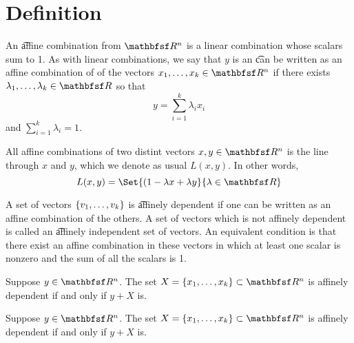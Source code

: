 
\section*{Definition}

An \t{affine combination} from $\R ^n$ is a linear combination whose scalars sum to 1.
As with linear combinations, we say that $y$ is an \t{can be written as an affine combination of} of the vectors $x_1, \dots , x_k \in \R ^n$ if there exists $\lambda _1, \dots , \lambda _k \in \R $ so that
\[
y = \sum_{i =1 }^{k} \lambda _i x_i
\]
and $\sum_{i = 1}^{k} \lambda _i = 1$.

All affine combinations of two distint vectors $x, y \in \R ^n$ is the line through $x$ and $y$, which we denote as usual $L(x, y)$.
In other words,
\[
L(x, y) = \Set{(1-\lambda x + \lambda y}{\lambda  \in \R }
\]

A set of vectors $\{v_1, \dots , v_k\}$ is \t{affinely dependent} if one can be written as an affine combination of the others.
A set of vectors which is not affinely dependent is called an \t{affinely independent set of vectors}.
An equivalent condition is that there exist an affine combination in these vectors in which at least one scalar is nonzero and the sum of all the scalars is 1.

\begin{proposition}
Suppose $y \in \R ^n$.
The set $X = \set{x_1, \dots , x_k} \subset \R ^n$ is affinely dependent if and only if $y + X$ is.
\end{proposition}

\begin{proposition}
Suppose $y \in \R ^n$.
The set $X = \set{x_1, \dots , x_k} \subset \R ^n$ is affinely dependent if and only if $y + X$ is.

\end{proposition}

\blankpage